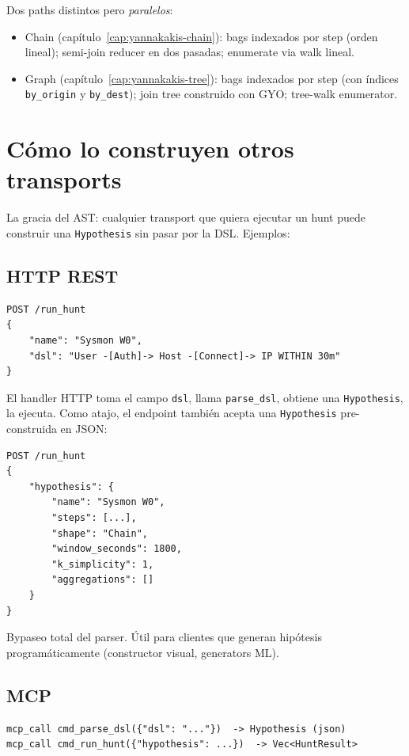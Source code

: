 \noindent
Dos paths distintos pero \emph{paralelos}:
\begin{itemize}
    \item Chain (capítulo~\ref{cap:yannakakis-chain}): bags
    indexados por step (orden lineal); semi-join reducer en dos
    pasadas; enumerate via walk lineal.
    \item Graph (capítulo~\ref{cap:yannakakis-tree}): bags
    indexados por step (con índices \texttt{by\_origin} y
    \texttt{by\_dest}); join tree construido con GYO; tree-walk
    enumerator.
\end{itemize}

\section{Cómo lo construyen otros transports}

La gracia del AST: cualquier transport que quiera ejecutar un hunt
puede construir una \texttt{Hypothesis} sin pasar por la DSL.
Ejemplos:

\subsection{HTTP REST}

\begin{lstlisting}
POST /run_hunt
{
    "name": "Sysmon W0",
    "dsl": "User -[Auth]-> Host -[Connect]-> IP WITHIN 30m"
}
\end{lstlisting}

\noindent
El handler HTTP toma el campo \texttt{dsl}, llama \texttt{parse\_dsl},
obtiene una \texttt{Hypothesis}, la ejecuta. Como atajo, el
endpoint también acepta una \texttt{Hypothesis} pre-construida en
JSON:

\begin{lstlisting}
POST /run_hunt
{
    "hypothesis": {
        "name": "Sysmon W0",
        "steps": [...],
        "shape": "Chain",
        "window_seconds": 1800,
        "k_simplicity": 1,
        "aggregations": []
    }
}
\end{lstlisting}

\noindent
Bypaseo total del parser. Útil para clientes que generan
hipótesis programáticamente (constructor visual, generators ML).

\subsection{MCP}

\begin{lstlisting}
mcp_call cmd_parse_dsl({"dsl": "..."})  -> Hypothesis (json)
mcp_call cmd_run_hunt({"hypothesis": ...})  -> Vec<HuntResult>
\end{lstlisting}

